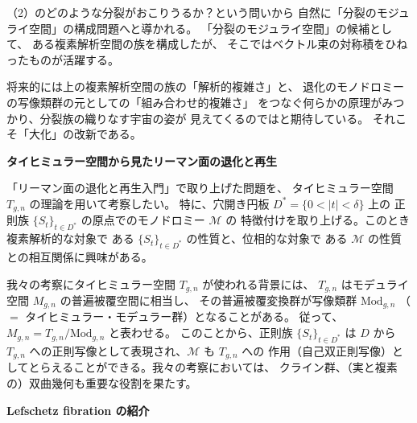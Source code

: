 \documentclass[uplatex,dvipdfmx]{jlreq}
\begin{document}
（2）のどのような分裂がおこりうるか？という問いから
自然に「分裂のモジュライ空間」の構成問題へと導かれる。
「分裂のモジュライ空間」の候補として、
ある複素解析空間の族を構成したが、
そこではベクトル束の対称積をひねったものが活躍する。

将来的には上の複素解析空間の族の「解析的複雑さ」と、
退化のモノドロミーの写像類群の元としての「組み合わせ的複雑さ」
をつなぐ何らかの原理がみつかり、分裂族の織りなす宇宙の姿が
見えてくるのではと期待している。
それこそ「大化」の改新である。

\newpage

\begin{center}
{\Large\bfseries タイヒミュラー空間から見たリーマン面の退化と再生}

\hspace*{\fill}{\large\bfseries 今吉 洋一（大阪市立大・理）}
\end{center}

\bigskip

「リーマン面の退化と再生入門」で取り上げた問題を、
タイヒミュラー空間 $T_{g, n}$ の理論を用いて考察したい。
特に、穴開き円板 $D^* = \{ 0 < |t| < \delta \}$ 上の
正則族 $\{S_t\}_{t\in D^*}$ の原点でのモノドロミー $\mathcal{M}$ の
特徴付けを取り上げる。このとき複素解析的な対象で
ある $\{S_t\}_{t\in D^*}$ の性質と、位相的な対象で
ある $\mathcal{M}$ の性質との相互関係に興味がある。

我々の考察にタイヒミュラー空間 $T_{g, n}$ が使われる背景には、
$T_{g, n}$ はモデュライ空間 $M_{g, n}$ の普遍被覆空間に相当し、
その普遍被覆変換群が写像類群 ${\mathrm{Mod}}_{g, n}$
（$=$ タイヒミュラー・モデュラー群）となることがある。
従って、$M_{g, n} = T_{g, n}/ {\mathrm{Mod}}_{g, n}$ と表わせる。
このことから、正則族 $\{S_t\}_{t\in D^*}$ は $D$ から
$T_{g, n}$ への正則写像として表現され、$\mathcal{M}$ も $T_{g, n}$ への
作用（自己双正則写像）としてとらえることができる。我々の考察においては、
クライン群、（実と複素の）双曲幾何も重要な役割を果たす。

\newpage

\begin{center}
{\Large\bfseries Lefschetz fibration の紹介}

\hspace*{\fill}{\large\bfseries 松本 幸夫（東大・数理）}
\end{center}
\end{document}
